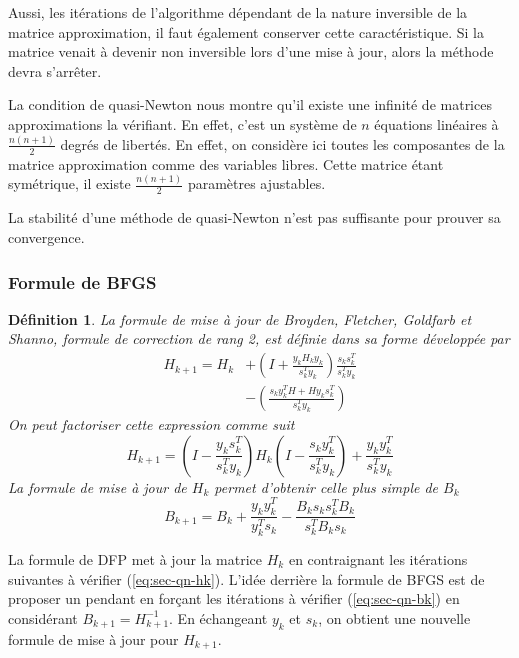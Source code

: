 \documentclass[3p, twocolumn]{elsarticle}
\newtheorem{definition}{Définition}[section]
\begin{document}
Aussi, les itérations de l'algorithme dépendant de la nature inversible de la matrice approximation, il faut également conserver cette caractéristique. Si la matrice venait à devenir non inversible lors d'une mise à jour, alors la méthode devra s'arrêter.

La condition de quasi-Newton nous montre qu'il existe une infinité de matrices approximations la vérifiant. En effet, c'est un système de $n$ équations linéaires à $\frac{n(n+1)}{2}$ degrés de libertés. En effet, on considère ici toutes les composantes de la matrice approximation comme des variables libres. Cette matrice étant symétrique, il existe $\frac{n(n+1)}{2}$ paramètres ajustables.

\begin{rmk}
    La stabilité d'une méthode de quasi-Newton n'est pas suffisante pour prouver sa convergence.
\end{rmk}

\subsubsection{Formule de BFGS}
\begin{definition}
    La formule de mise à jour de Broyden, Fletcher, Goldfarb et Shanno, formule de correction de rang 2, est définie dans sa forme développée par
    \begin{align}
        H_{k+1} = H_k & + \left(I + \frac{y_k H_k y_k}{s_k^T y_k}\right)\frac{s_k s_k^T}{s_k^T y_k}\nonumber \\
                      & -\left(\frac{s_k y_k^T H+ H y_k s_k^T}{s_k^T y_k}\right)
        \label{eq:bfgs-hk-developed}
    \end{align}
    On peut factoriser cette expression comme suit
    \begin{equation}
        H_{k+1} = \left(I - \frac{y_k s_k^T}{s_k^T y_k}\right) H_k \left(I - \frac{s_k y_k^T}{s_k^Ty_k}\right) + \frac{y_k y_k^T}{s_k^T y_k}
        \label{eq:bfgs-hk-factorised}
    \end{equation}
    La formule de mise à jour de $H_k$ permet d'obtenir celle plus simple de $B_{k}$
    \begin{equation}
        B_{k+1} = B_k + \frac{y_ky_k^T}{y_k^Ts_k}-\frac{B_ks_ks_k^TB_k}{s_k^TB_ks_k}
        \label{eq:bfgs-bk}
    \end{equation}
\end{definition}

La formule de DFP met à jour la matrice $H_k$ en contraignant les itérations suivantes à vérifier (\ref{eq:sec-qn-hk}). L'idée derrière la formule de BFGS est de proposer un pendant en forçant les itérations à vérifier (\ref{eq:sec-qn-bk}) en considérant $B_{k+1} = H_{k+1}^{-1}$. En échangeant $y_k$ et $s_k$, on obtient une nouvelle formule de mise à jour pour $H_{k+1}$.
\end{document}
